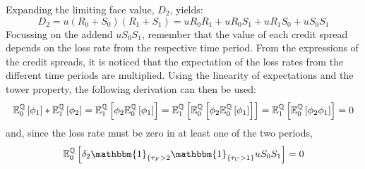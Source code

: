 \documentclass[main.tex]{subfiles}
\begin{document}
        Expanding the limiting face value, $D_{2}$, yields:
        \begin{equation}
            D_2 = u(R_0 + S_0)(R_1 + S_1) = u R_0 R_1 + u R_0 S_1 + u R_1 S_0 + u S_0 S_1
        \end{equation}
        Focussing on the addend $u S_0 S_1$, remember that the value of each credit spread depends on the loss rate from the respective time period.
        From the expressions of the credit spreads, it is noticed that the expectation of the loss rates from the different time periods are multiplied.
        Using the linearity of expectations and the tower property, the following derivation can then be used:
        \begin{equation*}
            \mathbb{E}_{0}^{\mathbb{Q}}\left[\phi_1\right]
            * \mathbb{E}_{1}^{\mathbb{Q}}\left[\phi_2\right]
            = \mathbb{E}_{1}^{\mathbb{Q}}\left[
                \phi_2 \mathbb{E}_{0}^{\mathbb{Q}}\left[\phi_1\right]
            \right] 
            = \mathbb{E}_{1}^{\mathbb{Q}}\left[
                \mathbb{E}_{0}^{\mathbb{Q}}\left[
                    \phi_2
                    \mathbb{E}_{0}^{\mathbb{Q}}\left[
                        \phi_1
                    \right]
                \right]
            \right]
            = \mathbb{E}_{1}^{\mathbb{Q}}\left[
                \mathbb{E}_{0}^{\mathbb{Q}}\left[
                    \phi_2 \phi_1
                \right]
            \right]
            = 0
        \end{equation*}
        and, since the loss rate must be zero in at least one of the two periods,
        \begin{equation}
            \mathbb{E}_{0}^{\rnmeasure}\left[\delta_2\mathbbm{1}_{\{\tau_{F}>2} \mathbbm{1}_{\{\tau_{C}>1\}}u S_0 S_1\right] = 0
        \end{equation}
        
\end{document}
